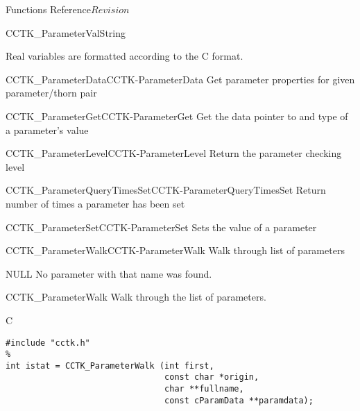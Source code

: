 \begin{cactuspart}{ Functions Reference}{}{$Revision$}
\begin{FunctionDescription}{CCTK\_ParameterValString}
\begin{Discussion}
Real variables are formatted according to the C  format.
\end{Discussion}

\begin{SeeAlsoSection}
\begin{SeeAlso2}{CCTK\_ParameterData}{CCTK-ParameterData}
  Get parameter properties for given parameter/thorn pair
\end{SeeAlso2}
\begin{SeeAlso2}{CCTK\_ParameterGet}{CCTK-ParameterGet}
  Get the data pointer to and type of a parameter's value
\end{SeeAlso2}
\begin{SeeAlso2}{CCTK\_ParameterLevel}{CCTK-ParameterLevel}
  Return the parameter checking level
\end{SeeAlso2}
\begin{SeeAlso2}{CCTK\_ParameterQueryTimesSet}{CCTK-ParameterQueryTimesSet}
  Return number of times a parameter has been set
\end{SeeAlso2}
\begin{SeeAlso2}{CCTK\_ParameterSet}{CCTK-ParameterSet}
  Sets the value of a parameter
\end{SeeAlso2}
\begin{SeeAlso2}{CCTK\_ParameterWalk}{CCTK-ParameterWalk}
  Walk through list of parameters
\end{SeeAlso2}
\end{SeeAlsoSection}

\begin{ErrorSection}
\begin{Error}{NULL}
No parameter with that name was found.
\end{Error}
\end{ErrorSection}
\end{FunctionDescription}


\begin{FunctionDescription}{CCTK\_ParameterWalk}
\label{CCTK-ParameterWalk}
Walk through the list of parameters.

\begin{SynopsisSection}
\begin{Synopsis}{C}
\begin{verbatim}
#include "cctk.h"
%
int istat = CCTK_ParameterWalk (int first,
                                const char *origin,
                                char **fullname,
                                const cParamData **paramdata);
\end{verbatim}
\end{Synopsis}
\end{SynopsisSection}


\end{FunctionDescription}
\end{cactuspart}
